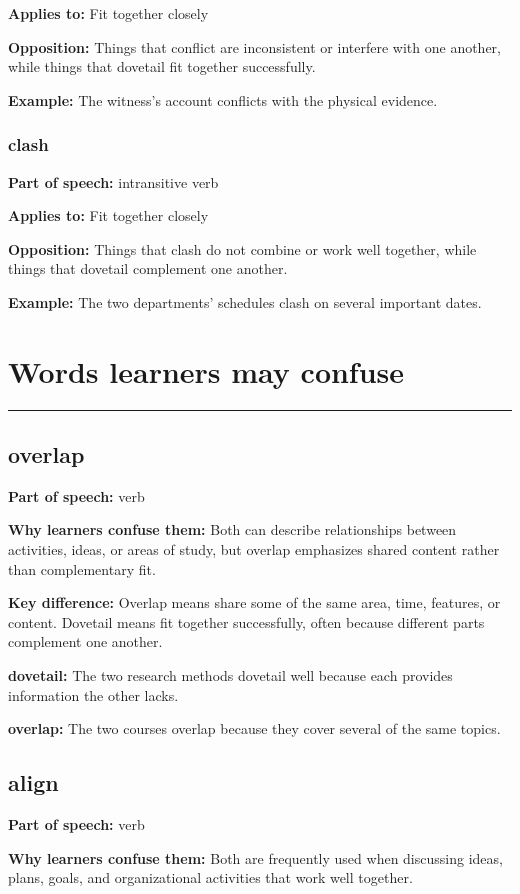 \documentclass[11pt]{article}
\newcommand{\sectionrule}{\par\vspace{-0.5em}\noindent\textcolor{Accent}{\rule{\linewidth}{0.6pt}}\par}
\begin{document}
\textbf{Applies to:} Fit together closely

\textbf{Opposition:} Things that conflict are inconsistent or interfere with one another, while things that dovetail fit together successfully.

\textbf{Example:} The witness's account conflicts with the physical evidence.

\subsubsection{clash}
\textbf{Part of speech:} intransitive verb

\textbf{Applies to:} Fit together closely

\textbf{Opposition:} Things that clash do not combine or work well together, while things that dovetail complement one another.

\textbf{Example:} The two departments' schedules clash on several important dates.

\section{Words learners may confuse}
\sectionrule
\subsection{overlap}
\textbf{Part of speech:} verb

\textbf{Why learners confuse them:} Both can describe relationships between activities, ideas, or areas of study, but overlap emphasizes shared content rather than complementary fit.

\textbf{Key difference:} Overlap means share some of the same area, time, features, or content. Dovetail means fit together successfully, often because different parts complement one another.

\textbf{dovetail:} The two research methods dovetail well because each provides information the other lacks.

\textbf{overlap:} The two courses overlap because they cover several of the same topics.

\subsection{align}
\textbf{Part of speech:} verb

\textbf{Why learners confuse them:} Both are frequently used when discussing ideas, plans, goals, and organizational activities that work well together.
\end{document}
